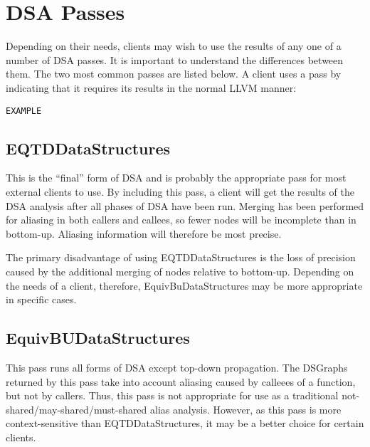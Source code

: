 \documentclass{article}
\begin{document}
\section{DSA Passes}

Depending on their needs, clients may wish to use the results of any
one of a number of DSA passes.  It is important to understand the
differences between them.  The two most common passes are listed
below.  A client uses a pass by indicating that it requires its
results in the normal LLVM manner:
\begin{verbatim}
EXAMPLE
\end{verbatim}

\subsection{EQTDDataStructures}

This is the ``final'' form of DSA and is probably the appropriate pass
for most external clients to use.  By including this pass, a client
will get the results of the DSA analysis after all phases of DSA have
been run.  Merging has been performed for aliasing in both callers and
callees, so fewer nodes will be incomplete than in bottom-up.
Aliasing information will therefore be most precise.

The primary disadvantage of using EQTDDataStructures is the loss of
precision caused by the additional merging of nodes relative to
bottom-up.  Depending on the needs of a client, therefore,
EquivBuDataStructures may be more appropriate in specific cases.

\subsection{EquivBUDataStructures}

This pass runs all forms of DSA except top-down propagation.  The
DSGraphs returned by this pass take into account aliasing caused by
calleees of a function, but not by callers.  Thus, this pass is not
appropriate for use as a traditional not-shared/may-shared/must-shared
alias analysis.  However, as this pass is more context-sensitive than
EQTDDataStructures, it may be a better choice for certain clients.
\end{document}
